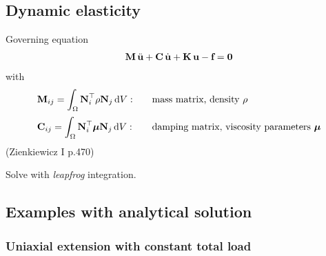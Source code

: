  
\subsection{Dynamic elasticity}

Governing equation
\begin{equation*}
  \begin{array}{lll}
    \textbf{M}\,\ddot{\textbf{u}} + \textbf{C}\,\dot{\textbf{u}} + \textbf{K}\,\textbf{u} - \textbf{f} = \textbf{0}
  \end{array}
\end{equation*}
with
\begin{equation*}
  \begin{array}{lll}
    \bfM_{ij} = \ds\int_{\Omega} \bfN_i^\top \rho \bfN_j \,\d V: \quad &\text{mass matrix, density $\rho$}\\[4mm]
    \bfC_{ij} = \ds\int_{\Omega} \bfN_i^\top \bfmu \bfN_j \,\d V: &\text{damping matrix, viscosity parameters $\bfmu$}
  \end{array}
\end{equation*}
(Zienkiewicz I p.470)

Solve with \emph{leapfrog} integration.

\subsection{Examples with analytical solution}
\subsubsection{Uniaxial extension with constant total load}


